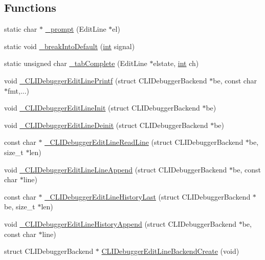\subsection*{Functions}
\begin{DoxyCompactItemize}
\item 
static char $\ast$ \mbox{\hyperlink{cli-el-backend_8c_a5e71c0be13cd0712fef8e1cb99cd2248}{\+\_\+prompt}} (Edit\+Line $\ast$el)
\item 
static void \mbox{\hyperlink{cli-el-backend_8c_ae0f25b9ee80b2ca1d806da7e83dd70da}{\+\_\+break\+Into\+Default}} (\mbox{\hyperlink{ioapi_8h_a787fa3cf048117ba7123753c1e74fcd6}{int}} signal)
\item 
static unsigned char \mbox{\hyperlink{cli-el-backend_8c_ac8fc3ad07748126ae6a19a218f312411}{\+\_\+tab\+Complete}} (Edit\+Line $\ast$elstate, \mbox{\hyperlink{ioapi_8h_a787fa3cf048117ba7123753c1e74fcd6}{int}} ch)
\item 
void \mbox{\hyperlink{cli-el-backend_8c_aba43aaf665d3cead03a590a728d3480d}{\+\_\+\+C\+L\+I\+Debugger\+Edit\+Line\+Printf}} (struct C\+L\+I\+Debugger\+Backend $\ast$be, const char $\ast$fmt,...)
\item 
void \mbox{\hyperlink{cli-el-backend_8c_a3dbc196c9232924e24cd18830e794588}{\+\_\+\+C\+L\+I\+Debugger\+Edit\+Line\+Init}} (struct C\+L\+I\+Debugger\+Backend $\ast$be)
\item 
void \mbox{\hyperlink{cli-el-backend_8c_a4ec593c2e2450412eed1176366439efe}{\+\_\+\+C\+L\+I\+Debugger\+Edit\+Line\+Deinit}} (struct C\+L\+I\+Debugger\+Backend $\ast$be)
\item 
const char $\ast$ \mbox{\hyperlink{cli-el-backend_8c_a3b2c1f4a09f7b764a00cd8864cefae82}{\+\_\+\+C\+L\+I\+Debugger\+Edit\+Line\+Read\+Line}} (struct C\+L\+I\+Debugger\+Backend $\ast$be, size\+\_\+t $\ast$len)
\item 
void \mbox{\hyperlink{cli-el-backend_8c_a0e5a0d606481fcc309020708f0163dfc}{\+\_\+\+C\+L\+I\+Debugger\+Edit\+Line\+Line\+Append}} (struct C\+L\+I\+Debugger\+Backend $\ast$be, const char $\ast$line)
\item 
const char $\ast$ \mbox{\hyperlink{cli-el-backend_8c_a57e17a93bb3ab3f8c5c9226aeb775d57}{\+\_\+\+C\+L\+I\+Debugger\+Edit\+Line\+History\+Last}} (struct C\+L\+I\+Debugger\+Backend $\ast$be, size\+\_\+t $\ast$len)
\item 
void \mbox{\hyperlink{cli-el-backend_8c_a5676d6c82d7fd2e118185b8abe763611}{\+\_\+\+C\+L\+I\+Debugger\+Edit\+Line\+History\+Append}} (struct C\+L\+I\+Debugger\+Backend $\ast$be, const char $\ast$line)
\item 
struct C\+L\+I\+Debugger\+Backend $\ast$ \mbox{\hyperlink{cli-el-backend_8c_aea9ca36da1b56d3b608e61aba06b9044}{C\+L\+I\+Debugger\+Edit\+Line\+Backend\+Create}} (void)
\end{DoxyCompactItemize}
